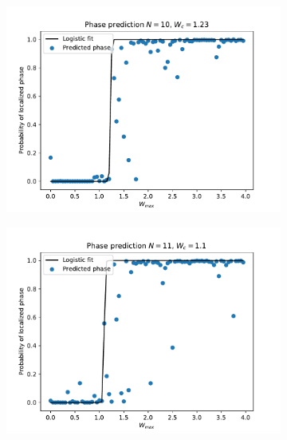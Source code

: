 \documentclass[reprint,amsmath,amssymb,aps,prb]{revtex4-2}
\begin{document}
\newpage
\begin{figure}[h!]
	\begin{subfigure}[c]{0.3\textwidth}
		\includegraphics[width=\textwidth]{../results/N10_predict_wc}
		\label{fig:N10_predict_wc}
	\end{subfigure}
	\begin{subfigure}[c]{0.3\textwidth}
		\includegraphics[width=\textwidth]{../results/N11_predict_wc}
		\label{fig:N11_predict_wc}
	\end{subfigure}
	\begin{subfigure}[c]{0.3\textwidth}

\end{subfigure}
\end{figure}
\end{document}
